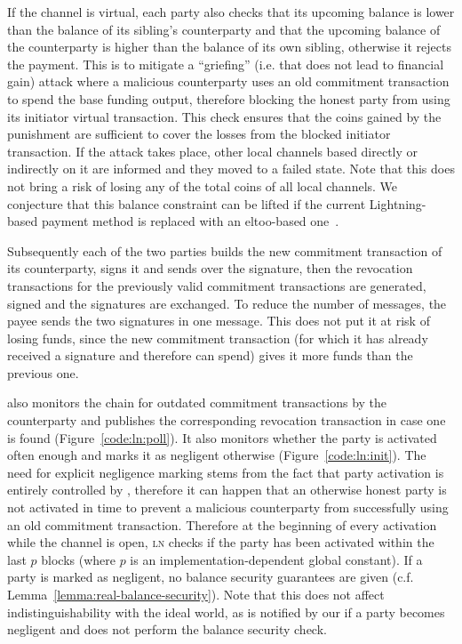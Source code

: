   If the channel is virtual, each party also checks that its upcoming balance is
  lower than the balance of its sibling's counterparty and that the upcoming
  balance of the counterparty is higher than the balance of its own sibling,
  otherwise it rejects the payment. This is to mitigate a ``griefing'' (i.e.
  that does not lead to financial gain) attack where a malicious counterparty
  uses an old commitment transaction to spend the base funding output, therefore
  blocking the honest party from using its initiator virtual transaction. This
  check ensures that the coins gained by the punishment are sufficient to cover
  the losses from the blocked initiator transaction. If the attack takes place,
  other local channels based directly or indirectly on it are informed and they
  moved to a failed state. Note that this does not bring a risk of losing any of
  the total coins of all local channels. We conjecture that this balance
  constraint can be lifted if the current Lightning-based payment method is
  replaced with an eltoo-based one~\cite{eltoo}.

  Subsequently each of the two parties builds the new commitment transaction of
  its counterparty, signs it and sends over the signature, then the revocation
  transactions for the previously valid commitment transactions are generated,
  signed and the signatures are exchanged. To reduce the number of messages, the
  payee sends the two signatures in one message. This does not put it at risk of
  losing funds, since the new commitment transaction (for which it has already
  received a signature and therefore can spend) gives it more funds than the
  previous one.

  \pchan also monitors the chain for outdated commitment transactions by the
  counterparty and publishes the corresponding revocation transaction in case
  one is found (Figure~\ref{code:ln:poll}). It also monitors whether the party
  is activated often enough and marks it as negligent otherwise
  (Figure~\ref{code:ln:init}). The need for explicit negligence marking stems
  from the fact that party activation is entirely controlled by \environment,
  therefore it can happen that an otherwise honest party is not activated in
  time to prevent a malicious counterparty from successfully using an old
  commitment transaction. Therefore at the beginning of every activation while
  the channel is open, \textsc{ln} checks if the party has been activated within
  the last $p$ blocks (where $p$ is an implementation-dependent global
  constant). If a party is marked as negligent, no balance security guarantees
  are given (c.f. Lemma~\ref{lemma:real-balance-security}). Note that this does
  not affect indistinguishability with the ideal world, as \fchan is notified by
  our \simulator if a party becomes negligent and does not perform the balance
  security check.

